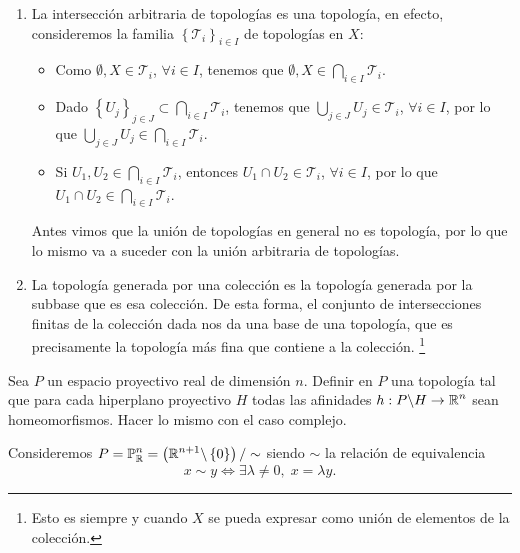 \documentclass{article}
\begin{document}
\begin{sol}
\begin{enumerate}
Si $\displaystyle U \in \mathcal{T}_{\mathcal{T}_{1}\cup\mathcal{T}_{2}} $, tenemos que $\displaystyle U $ es unión de intersecciones finitas de elementos de $\displaystyle \mathcal{T}_{1} \cup \mathcal{T}_{2} $, esto es
\[U = \bigcup_{i \in I}\left(\bigcap_{j = 1}^{r_{i}}V_{j}\right) , \quad V_{j}\in \mathcal{T}_{1} \cup \mathcal{T}_{2},\]
Claramente tendremos que $\displaystyle U \in \mathcal{T} $ por ser esta una topología que contiene a $\displaystyle \mathcal{T}_{1} \cup \mathcal{T}_{2} $. Por tanto, hemos visto que $\displaystyle \mathcal{T}_{\mathcal{T}_{1} \cup \mathcal{T}_{2}} $ es la topología más fina que contiene a $\displaystyle \mathcal{T}_{1} \cup \mathcal{T}_{2} $. 
\item La intersección arbitraria de topologías es una topología, en efecto, consideremos la familia $\displaystyle \left\{ \mathcal{T}_{i}\right\} _{i \in I} $ de topologías en $\displaystyle X $:
	\begin{itemize}
	\item Como $\displaystyle \emptyset, X \in \mathcal{T}_{i} $, $\displaystyle \forall i \in I $, tenemos que $\displaystyle \emptyset, X \in \bigcap_{ i \in I}\mathcal{T}_{i} $. 
	\item Dado $\displaystyle \left\{ U_{j}\right\} _{j \in J} \subset \bigcap_{i \in I}\mathcal{T}_{i}$, tenemos que $\displaystyle \bigcup_{j \in J}U_{j}\in \mathcal{T}_{i} $, $\displaystyle \forall i \in I $, por lo que $\displaystyle \bigcup_{j \in J}U_{j}\in \bigcap_{i \in I}\mathcal{T}_{i} $. 
	\item Si $\displaystyle U_{1} , U_{2} \in \bigcap_{i \in I}\mathcal{T}_{i} $, entonces $\displaystyle U_{1} \cap U_{2} \in \mathcal{T}_{i} $, $\displaystyle \forall i \in I $, por lo que $\displaystyle U_{1} \cap U_{2} \in \bigcap_{i \in I}\mathcal{T}_{i} $. 
	\end{itemize}
	Antes vimos que la unión de topologías en general no es topología, por lo que lo mismo va a suceder con la unión arbitraria de topologías. 
\item La topología generada por una colección es la topología generada por la subbase que es esa colección. De esta forma, el conjunto de intersecciones finitas de la colección dada nos da una base de una topología, que es precisamente la topología más fina que contiene a la colección. \footnote{Esto es siempre y cuando $\displaystyle X $ se pueda expresar como unión de elementos de la colección.} 
\end{enumerate}
\end{sol}
\begin{ej}[Número 1.21]
	Sea $\displaystyle P $ un espacio proyectivo real de dimensión $\displaystyle n $. Definir en $\displaystyle P $ una topología tal que para cada hiperplano proyectivo $\displaystyle H $ todas las afinidades $\displaystyle h : P \backslash H \to \mathbb{R}^{n} $ sean homeomorfismos. Hacer lo mismo con el caso complejo.
\end{ej}
\begin{sol}
	Consideremos $\displaystyle P = \mathbb{P}^{n}_{\mathbb{R}}=\left(\mathbb{R}^{n+1} \backslash \left\{ 0\right\} \right)/ \sim $ siendo $\displaystyle \sim $ la relación de equivalencia
	\[x \sim y \iff \exists\lambda\neq 0, \; x = \lambda y .\]
	 
\end{sol}
\end{document}
